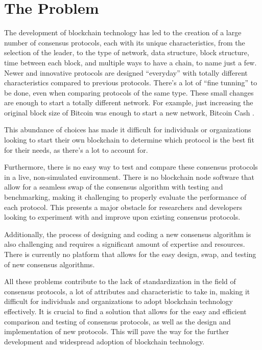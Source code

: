 \section{The Problem}
The development of blockchain technology has led to the creation of a large number of consensus protocols, each with its unique characteristics, from the selection of the leader, to the type of network, data structure, block structure, time between each block, and multiple ways to have a chain, to name just a few. Newer and innovative protocols are designed ``everyday'' with totally different characteristics compared to previous protocols. There's a lot of ``fine tunning'' to be done, even when comparing protocols of the same type. These small changes are enough to start a totally different network. For example, just increasing the original block size of Bitcoin was enough to start a new network, Bitcoin Cash \cite{bitcoincash}.
\label{bitcoincashexample}

This abundance of choices has made it difficult for individuals or organizations looking to start their own blockchain to determine which protocol is the best fit for their needs, as there's a lot to account for.

Furthermore, there is no easy way to test and compare these consensus protocols in a live, non-simulated environment.
There is no blockchain node software that allow for a seamless swap of the consensus algorithm with testing and benchmarking, making it challenging to properly evaluate the performance of each protocol. This presents a major obstacle for researchers and developers looking to experiment with and improve upon existing consensus protocols.

Additionally, the process of designing and coding a new consensus algorithm is also challenging and requires a significant amount of expertise and resources. There is currently no platform that allows for the easy design, swap, and testing of new consensus algorithms.

All these problems contribute to the lack of standardization in the field of consensus protocols, a lot of attributes and characteristic to take in, making it difficult for individuals and organizations to adopt blockchain technology effectively.
It is crucial to find a solution that allows for the easy and efficient comparison and testing of consensus protocols, as well as the design and implementation of new protocols. This will pave the way for the further development and widespread adoption of blockchain technology.


